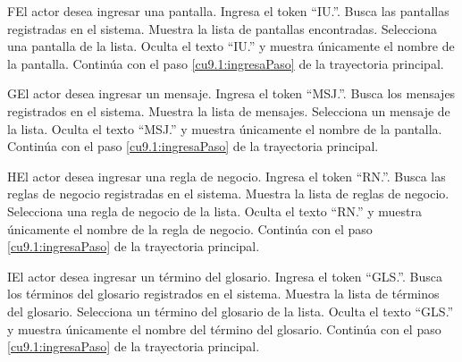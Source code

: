  \begin{UCtrayectoriaA}{F}{El actor desea ingresar una pantalla.}
 	\UCpaso[\UCactor] Ingresa el token ``IU.''.	
 	\UCpaso[\UCsist] Busca las pantallas registradas en el sistema. 
 	\UCpaso[\UCsist] Muestra la lista de pantallas encontradas.
 	\UCpaso[\UCactor] Selecciona una pantalla de la lista.
  	\UCpaso[\UCsist] Oculta el texto ``IU.'' y muestra únicamente el nombre de la pantalla.
    \UCpaso[] Continúa con el paso \ref{cu9.1:ingresaPaso} de la trayectoria principal.
 \end{UCtrayectoriaA}

 \begin{UCtrayectoriaA}{G}{El actor desea ingresar un mensaje.}
 	 \UCpaso[\UCactor] Ingresa el token ``MSJ.''.	
 	\UCpaso[\UCsist] Busca los mensajes registrados en el sistema. 
 	\UCpaso[\UCsist] Muestra la lista de mensajes.
 	\UCpaso[\UCactor] Selecciona un mensaje de la lista.
  	\UCpaso[\UCsist] Oculta el texto ``MSJ.'' y muestra únicamente el nombre de la pantalla.
    \UCpaso[] Continúa con el paso \ref{cu9.1:ingresaPaso} de la trayectoria principal.
 \end{UCtrayectoriaA}

 \begin{UCtrayectoriaA}{H}{El actor desea ingresar una regla de negocio.}
 	\UCpaso[\UCactor] Ingresa el token ``RN.''.	
 	\UCpaso[\UCsist] Busca las reglas de negocio registradas en el sistema. 
 	\UCpaso[\UCsist] Muestra la lista de reglas de negocio.
 	\UCpaso[\UCactor] Selecciona una regla de negocio de la lista.
  	\UCpaso[\UCsist] Oculta el texto ``RN.'' y muestra únicamente el nombre de la regla de negocio.
    \UCpaso[] Continúa con el paso \ref{cu9.1:ingresaPaso} de la trayectoria principal.
 \end{UCtrayectoriaA}

 \begin{UCtrayectoriaA}{I}{El actor desea ingresar un término del glosario.}
 	\UCpaso[\UCactor] Ingresa el token ``GLS.''.	
 	\UCpaso[\UCsist] Busca los términos del glosario registrados en el sistema. 
 	\UCpaso[\UCsist] Muestra la lista de términos del glosario.
 	\UCpaso[\UCactor] Selecciona un término del glosario de la lista.
  	\UCpaso[\UCsist] Oculta el texto ``GLS.'' y muestra únicamente el nombre del término del glosario.
    \UCpaso[] Continúa con el paso \ref{cu9.1:ingresaPaso} de la trayectoria principal.
 \end{UCtrayectoriaA}

